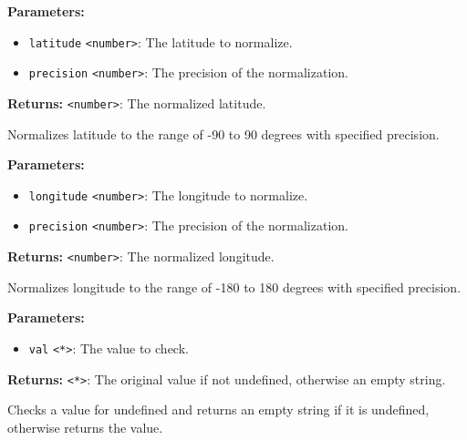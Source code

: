 \documentclass[12pt,a4paper]{article}
\begin{document}
\noindent \textbf{Parameters:}
\begin{itemize}
  \item \texttt{latitude} \texttt{<number>}: The latitude to normalize.
  \item \texttt{precision} \texttt{<number>}: The precision of the normalization.
\end{itemize}

\noindent \textbf{Returns:} \texttt{<number>}: The normalized latitude.

\noindent Normalizes latitude to the range of -90 to 90 degrees with specified precision.

\vspace{5mm}
\noindent {}


\noindent \textbf{Parameters:}
\begin{itemize}
  \item \texttt{longitude} \texttt{<number>}: The longitude to normalize.
  \item \texttt{precision} \texttt{<number>}: The precision of the normalization.
\end{itemize}

\noindent \textbf{Returns:} \texttt{<number>}: The normalized longitude.

\noindent Normalizes longitude to the range of -180 to 180 degrees with specified precision.

\vspace{5mm}
\noindent {}


\noindent \textbf{Parameters:}
\begin{itemize}
  \item \texttt{val} \texttt{<*>}: The value to check.
\end{itemize}

\noindent \textbf{Returns:} \texttt{<*>}: The original value if not undefined, otherwise an empty string.

\noindent Checks a value for undefined and returns an empty string if it is undefined, otherwise returns the value.

\vspace{5mm}
\noindent {}
\end{document}
